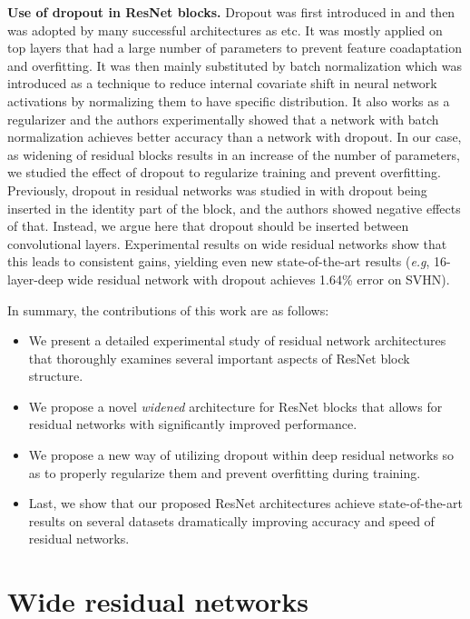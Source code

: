 \documentclass{bmvc2k}
\def\eg{\emph{e.g}\bmvaOneDot}
\begin{document}
\textbf{Use of dropout in ResNet blocks.}
Dropout was first introduced in \cite{srivastava14a} and then was adopted by many successful architectures as \cite{AlexNet,Simonyan15} etc. It was mostly applied on top layers that had a large number of parameters to prevent feature coadaptation and overfitting. It was then mainly substituted by batch normalization  \cite{icml2015_ioffe15} which was introduced as a technique to reduce internal covariate shift in neural network activations by normalizing them to have specific distribution. It also works as a regularizer and the authors experimentally showed that a network with batch normalization achieves better accuracy than a network with dropout. In our case, as widening of residual blocks results in an increase of the number of parameters, we studied the effect of dropout to regularize training and prevent overfitting. Previously, dropout in residual networks was studied in \cite{basicblock2} with dropout being inserted in the identity part of the block, and the authors showed negative effects of that. Instead, we argue here that dropout should be inserted between convolutional layers.
Experimental results on wide residual networks show that this leads to consistent  gains, yielding even new state-of-the-art results (\eg, 16-layer-deep wide residual network with dropout  achieves 1.64\% error on SVHN).

In summary, the contributions of this work are as follows:
\begin{itemize}
    \setlength\itemsep{0.1em}
  \item{We present a detailed  experimental study of residual network architectures that thoroughly examines several important aspects of ResNet block structure.}
  \item{We propose a novel \textit{widened} architecture for ResNet blocks that allows for residual networks with significantly improved  performance.}
  \item{We propose a new way of utilizing  dropout within deep residual networks so as to properly regularize them and prevent overfitting during training. }
  \item{Last, we show that our proposed ResNet architectures achieve state-of-the-art results on several datasets dramatically improving accuracy and speed of residual networks.}
\end{itemize}

\section{Wide residual networks}
\end{document}
